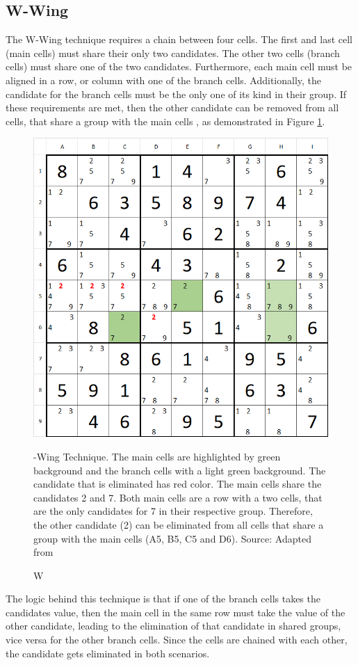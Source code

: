\documentclass[twoside]{ausarbeitung}
\begin{document}
\subsection{W-Wing}
The W-Wing technique requires a chain between four cells. The first and last cell (main cells) must share their only two candidates. The other two cells (branch cells) must share one of the two candidates. Furthermore, each main cell must be aligned in a row, or column with one of the branch cells. Additionally, the candidate for the branch cells must be the only one of its kind in their group. If these requirements are met, then the other candidate can be removed from all cells, that share a group with the main cells \cite{WWingSud29:online}, as demonstrated in Figure \ref{fig:wwing}.

\begin{figure}[H]
  \centering
  \includegraphics[width=.55\linewidth]{images/wwing}
  \caption[W-Wing] W-Wing Technique. The main cells are highlighted by green background and the branch cells with a light green background. The candidate that is eliminated has red color. The main cells share the candidates 2 and 7. Both main cells are a row with a two cells, that are the only candidates for 7 in their respective group. Therefore, the other candidate (2) can be eliminated from all cells that share a group with the main cells (A5, B5, C5 and D6). Source: Adapted from \cite{WWingSud29:online}
  \label{fig:wwing}
\end{figure}%

The logic behind this technique is that if one of the branch cells takes the candidates value, then the main cell in the same row must take the value of the other candidate, leading to the elimination of that candidate in shared groups, vice versa for the other branch cells. Since the cells are chained with each other, the candidate gets eliminated in both scenarios.
\end{document}
